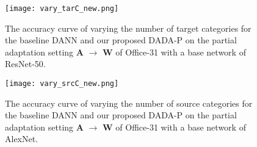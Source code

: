\documentclass[letterpaper]{article} \usepackage{aaai20}  \usepackage{times}  \usepackage{helvet} \usepackage{courier}  \usepackage[hyphens]{url}  \usepackage{graphicx} \urlstyle{rm} \def\UrlFont{\rm}  \usepackage{graphicx}  \frenchspacing  \setlength{\pdfpagewidth}{8.5in}  \setlength{\pdfpageheight}{11in}
\begin{document}
\begin{figure}[t]
	\begin{center}
\texttt{[image: vary\_tarC\_new.png]}
	\end{center}
	\caption{The accuracy curve of varying the number of target categories for the baseline DANN \cite{dann} and our proposed DADA-P on the partial adaptation setting \textbf{A} $\rightarrow$ \textbf{W} of Office-31 with a base network of ResNet-50.}
	\label{fig:partial_vary_tarC}
\end{figure}

\begin{figure}[t]
	\begin{center}
\texttt{[image: vary\_srcC\_new.png]}
	\end{center}
	\caption{The accuracy curve of varying the number of source categories for the baseline DANN \cite{dann} and our proposed DADA-P on the partial adaptation setting \textbf{A} $\rightarrow$ \textbf{W} of Office-31 with a base network of AlexNet.}
	\label{fig:partial_vary_srcC}
\end{figure}

\begin{table*}[!htb]
	\begin{center}
		\caption{Results for partial domain adaptation on Office-31 based on AlexNet.}
		\label{table:results_office31_partial_transfer_alexnet}
	\end{center}
\end{table*}
\end{document}
